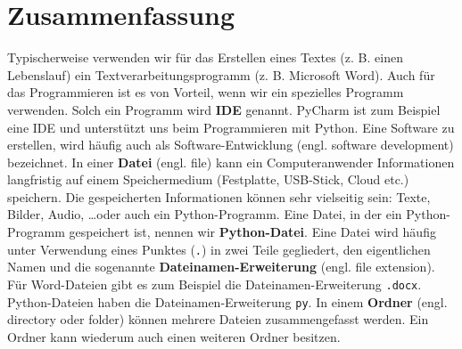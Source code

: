\section{Zusammenfassung}

Typischerweise verwenden wir für das Erstellen eines Textes (z. B. einen Lebenslauf) ein Textverarbeitungsprogramm (z. B. Microsoft Word). Auch für das Programmieren ist es von Vorteil, wenn wir ein spezielles Programm verwenden. Solch ein Programm wird \textbf{\ac{IDE}} genannt. PyCharm ist zum Beispiel eine IDE und unterstützt uns beim Programmieren mit Python. Eine Software zu erstellen, wird häufig auch als Software-Entwicklung (engl. software development) bezeichnet. In einer \textbf{Datei} (engl. file) kann ein Computeranwender Informationen langfristig auf einem Speichermedium (Festplatte, USB-Stick, Cloud etc.) speichern. Die gespeicherten Informationen können sehr vielseitig sein: Texte, Bilder, Audio, \dots oder auch ein Python-Programm. Eine Datei, in der ein Python-Programm gespeichert ist, nennen wir \textbf{Python-Datei}. Eine Datei wird häufig unter Verwendung eines Punktes (\texttt{.}) in zwei Teile gegliedert, den eigentlichen Namen und die sogenannte \textbf{Dateinamen-Erweiterung} (engl. file extension). Für Word-Dateien gibt es zum Beispiel die Dateinamen-Erweiterung \texttt{.docx}. Python-Dateien haben die Dateinamen-Erweiterung \texttt{py}. In einem \textbf{Ordner} (engl. directory oder folder) können mehrere Dateien zusammengefasst werden. Ein Ordner kann wiederum auch einen weiteren Ordner besitzen.